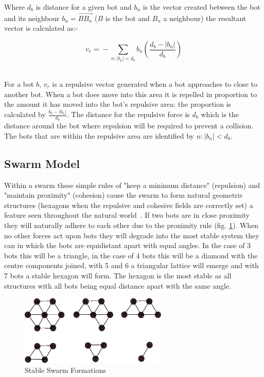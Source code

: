 \documentclass[10pt,journal,letterpaper,twoside]{IEEEtran}
\newcommand{\Fig}{fig.}
\begin{document}
Where $d_b$ is distance for a given bot and $b_n$ is the vector
created between the bot and its neighbour $b_n =‎
\overrightarrow{BB_n}$ ($B$ is the bot and $B_n$ a neighbour) the
resultant vector is calculated as:-

\begin{equation}
\label{eq:Repulsion1}
v_{r} =‎ - \sum_{n:|b_n| < d_b^{}} {b_n} \left ( \frac{d_b - |b_n|}{d_b} \right )
\end{equation}‎

For a bot $b$, $v_{r}$ is a repulsive vector generated when a bot
approaches to close to another bot. When a bot does move into this
area it is repelled in proportion to the amount it has moved into the
bot's repulsive area: the proportion is calculated by $\frac{b_{b} -
  |b_{n}|}{d_b}$. The distance for the repulsive force is $d_b$ which
is the distance around the bot where repulsion will be required to
prevent a collision. The bots that are within the repulsive area are
identified by ${n:|b_{n}| < d_b}$.

\subsection{Swarm Model}

Within a swarm these simple rules of "keep a minimum distance"
(repulsion) and "maintain proximity" (cohesion) cause the swarm to
form natural geometric structures (hexagons when the repulsive and
cohesive fields are correctly set) a feature seen throughout the
natural world~\cite{ALMC13}.  If two bots are in close proximity they
will naturally adhere to each other due to the proximity rule (\Fig{}
\ref{fig:StableForms}). When no other forces act upon bots they will
degrade into the most stable system they can in which the bots are
equidistant apart with equal angles.  In the case of 3 bots this will
be a triangle, in the case of 4 bots this will be a diamond with the
centre components joined, with 5 and 6 a triangular lattice will
emerge and with 7 bots a stable hexagon will form. The hexagon is the
most stable as all structures with all bots being equal distance apart
with the same angle.

\begin{figure}[H]
\begin{center}
\includegraphics[width=7cm]{figures/StableForms}
\end{center}
\caption{Stable Swarm Formations}\label{fig:StableForms}
\end{figure}
\end{document}
